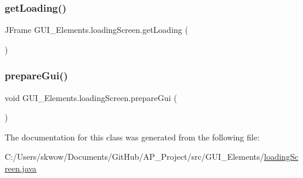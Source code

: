 \subsubsection{\texorpdfstring{get\+Loading()}{getLoading()}}
{\footnotesize\ttfamily J\+Frame G\+U\+I\+\_\+\+Elements.\+loading\+Screen.\+get\+Loading (\begin{DoxyParamCaption}{ }\end{DoxyParamCaption})}

\hypertarget{class_g_u_i___elements_1_1loading_screen_afa7caf6e03de405b8b9c0d6619bac201}{}\label{class_g_u_i___elements_1_1loading_screen_afa7caf6e03de405b8b9c0d6619bac201} 
\subsubsection{\texorpdfstring{prepare\+Gui()}{prepareGui()}}
{\footnotesize\ttfamily void G\+U\+I\+\_\+\+Elements.\+loading\+Screen.\+prepare\+Gui (\begin{DoxyParamCaption}{ }\end{DoxyParamCaption})}



The documentation for this class was generated from the following file\+:\begin{DoxyCompactItemize}
\item 
C\+:/\+Users/skwow/\+Documents/\+Git\+Hub/\+A\+P\+\_\+\+Project/src/\+G\+U\+I\+\_\+\+Elements/\hyperlink{loading_screen_8java}{loading\+Screen.\+java}\end{DoxyCompactItemize}
